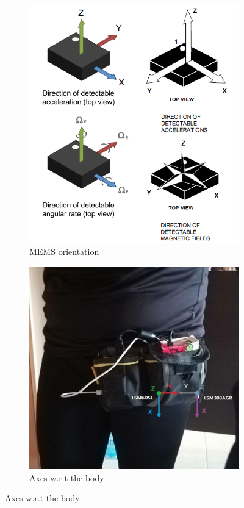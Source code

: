 \begin{center}
	\begin{figure}[H]
		\begin{subfigure}[H]{0.45\textwidth}
			\includegraphics[scale=0.55]{figures/mems_axes.png}
			\caption{MEMS orientation}\label{fig:4a}
		\end{subfigure}
		\begin{subfigure}[H]{0.45\textwidth}
			\includegraphics[scale=0.45]{figures/sensor_orientation.jpg}
			\caption{Axes w.r.t the body}\label{fig:4b}
		\end{subfigure}
	\end{figure} 
\end{center}
